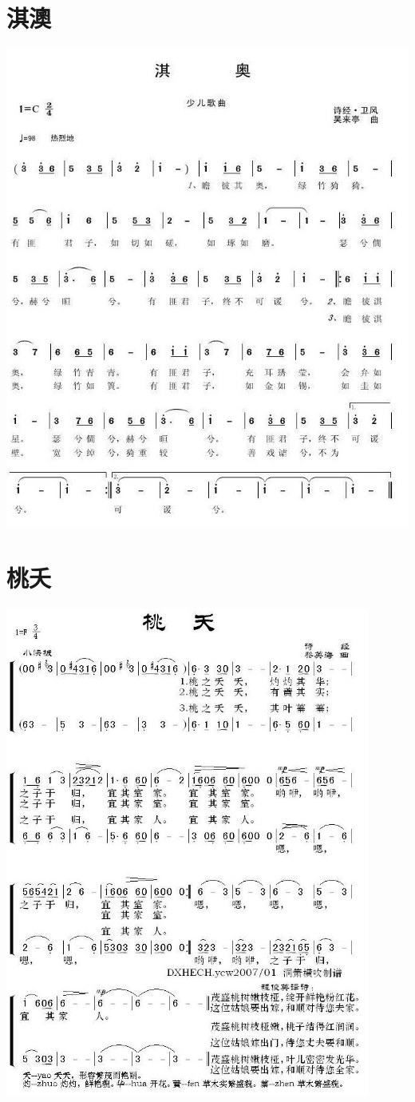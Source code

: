 \documentclass[cn,pad,twocol]{elegantbook}
\begin{document}
\section{淇澳}      \includegraphics[width=\textwidth]{rpi400/20210123-淇澳.jpg}
\section{桃夭}      \includegraphics[width=0.9\textwidth]{rpi400/20210123-桃夭.jpg}
\end{document}
